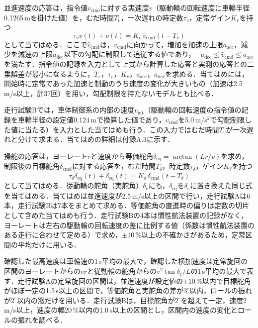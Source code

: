 並進速度の応答は，指令値$v_{\mathrm{cmd}}$に対する実速度$v$（駆動輪の回転速度に車輪半径0.1265\,mを掛けた値）を，むだ時間$T_v$，一次遅れの時定数$\tau_v$，定常ゲイン$K_v$を持つ
\begin{equation}
  \tau_v \dot{v}(t) + v(t) = K_v\, \hat{v}_{\mathrm{cmd}}(t - T_v)
  \label{eq:vmodel}
\end{equation}
として当てはめる．ここで$\hat{v}_{\mathrm{cmd}}$は，$v_{\mathrm{cmd}}$に向かって，増加を加速の上限$a_{\mathrm{acc}}$，減少を減速の上限$a_{\mathrm{dec}}$以下の勾配に制限して追従する値であり，$-a_{\mathrm{dec}} \le \dot{\hat{v}}_{\mathrm{cmd}} \le a_{\mathrm{acc}}$を満たす．指令値の記録を入力として上式から計算した応答と実測の応答との二乗誤差が最小になるように，$T_v$，$\tau_v$，$K_v$，$a_{\mathrm{acc}}$，$a_{\mathrm{dec}}$を求める．当てはめには，開始時に定常であった加速と制動のうち速度の変化が大きいもの（加速は2.5\,m/s以上，計37回）を用い，勾配制限を持たないモデルとも比べる．

走行試験Bでは，車体制御系の内部の速度$v_{\mathrm{int}}$（駆動輪の回転速度の指令値の記録を車輪半径の設定値0.124\,mで換算した値であり，$v_{\mathrm{cmd}}$を5.0\,m/s$^2$で勾配制限した値に当たる）を入力とした当てはめも行う．この入力ではむだ時間$T_v$が一次遅れと分けて求まる．当てはめの詳細は付録A.3に示す．

操舵の応答は，ヨーレート$r$と速度から等価舵角$\delta_{\mathrm{eq}}=\arctan(L r / v)$を求め，制限後の目標舵角$\delta_{\mathrm{cmd}}$に対する応答を，むだ時間$T_\delta$，時定数$\tau_\delta$，ゲイン$K_\delta$を持つ
\begin{equation}
  \tau_\delta \dot{\delta}_{\mathrm{eq}}(t) + \delta_{\mathrm{eq}}(t) = K_\delta\, \delta_{\mathrm{cmd}}(t - T_\delta)
  \label{eq:steermodel}
\end{equation}
として当てはめる．従動輪の舵角（実舵角）$\delta_{\mathrm{c}}$にも，$\delta_{\mathrm{eq}}$を$\delta_{\mathrm{c}}$に置き換えた同じ式を当てはめる．当てはめは並進速度が2.5\,m/s以上の区間で行い，走行試験Aは6本，走行試験Bは7本をまとめて求める．等価舵角の直進時の偏りは定数の切片として含めた当てはめも行う．走行試験Bの4本は慣性航法装置の記録がなく，ヨーレートは左右の駆動輪の回転速度の差に比例する値（係数は慣性航法装置のある走行に合わせて定める）で求め，$\pm 10$\,\%以上の不確かさがあるため，定常区間の平均だけに用いる．

確認した最高速度は車輪速の1\,s平均の最大で，確認した横加速度は定常旋回の区間のヨーレートからの$vr$と従動輪の舵角からの$v^2\tan\delta_{\mathrm{c}}/L$の1\,s平均の最大で表す．走行試験Aの定常旋回の区間は，並進速度が設定値の$\pm 10$\,\%以内で目標舵角がほぼ一定の1.5\,s以上の区間で，等価舵角と実舵角の差が$3^\circ$以内，ロールの振れが$2^\circ$以内の窓だけを用いる．走行試験Bは，目標舵角が$2^\circ$を超えて一定，速度2\,m/s以上，速度の幅20\,\%以内の1.0\,s以上の区間とし，区間内の速度の変化とロールの振れを調べる．

